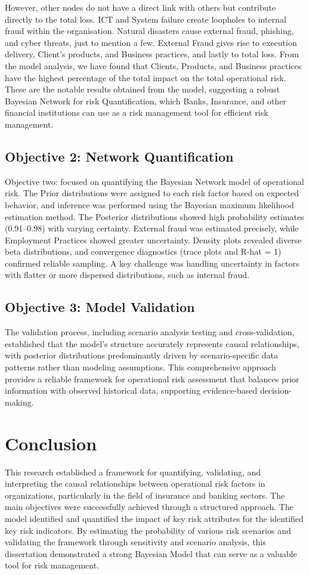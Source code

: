 However, other nodes do not have a direct link with others but contribute directly to the total loss. ICT and System failure create loopholes to internal fraud within the organisation. Natural disasters cause external fraud, phishing, and cyber threats, just to mention a few. External Fraud gives rise to execution delivery, Client's products, and Business practices, and lastly to total loss. From the model analysis, we have found that Clients, Products, and Business practices have the highest percentage of the total impact on the total operational risk. These are the notable results obtained from the model, suggesting a robust Bayesian Network for risk Quantification, which Banks, Insurance, and other financial institutions can use as a risk management tool for efficient risk management.

\subsection{Objective 2: Network Quantification}
Objective two: focused on quantifying the Bayesian Network model of operational risk. The Prior distributions were assigned to each risk factor based on expected behavior, and inference was performed using the Bayesian maximum likelihood estimation method. The Posterior distributions showed high probability estimates (0.91–0.98) with varying certainty. External fraud was estimated precisely, while Employment Practices showed greater uncertainty. Density plots revealed diverse beta distributions, and convergence diagnostics (trace plots and R-hat = 1) confirmed reliable sampling. A key challenge was handling uncertainty in factors with flatter or more dispersed distributions, such as internal fraud.

\subsection{Objective 3: Model Validation}
The validation process, including scenario analysis testing and cross-validation, established that the model's structure accurately represents causal relationships, with posterior distributions predominantly driven by scenario-specific data patterns rather than modeling assumptions. This comprehensive approach provides a reliable framework for operational risk assessment that balances prior information with observed historical data, supporting evidence-based decision-making.

\section{Conclusion} 
This research established a framework for quantifying, validating, and interpreting the causal relationships between operational risk factors in organizations, particularly in the field of insurance and banking sectors. The main objectives were successfully achieved through a structured approach. The model identified and quantified the impact of key risk attributes for the identified key risk indicators. By estimating the probability of various risk scenarios and validating the framework through sensitivity and scenario analysis, this dissertation demonstrated a strong Bayesian Model that can serve as a valuable tool for risk management.

